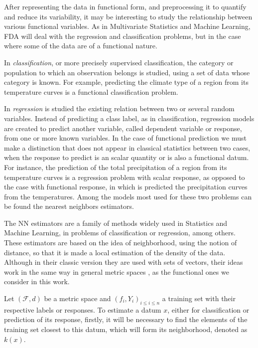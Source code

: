 
After representing the data in functional form, and preprocessing it to quantify and
reduce its variability, it may be interesting to study the relationship between
various functional variables. As in Multivariate Statistics and Machine Learning,
FDA will deal with the regression and classification problems, but in the case
where some of the data are of a functional nature.


In \textit{classification}, or more precisely supervised classification, the category or
population to which an observation belongs is studied, using a set of data whose
category is known. For example, predicting the climate type of a region from
its temperature curves is a functional classification problem.

In \textit{regression} is studied the existing relation between two or several
random variables. Instead of predicting a class label, as in classification,
regression models are created to predict another variable, called dependent
variable or response, from one or more known variables. In the case of
functional prediction we must make a distinction that does not appear in
classical statistics between two cases, when the response to predict is an
scalar quantity or is also a functional datum. For instance, the prediction of
the total precipitation of a region from its temperature curves is a regression
problem with scalar response, as opposed to the case with functional response,
in which is predicted the precipitation curves from the temperatures.
Among the models most used for these two problems can be found the nearest
neighbors estimators.



The \ac{NN} estimators are a family of methods widely
used in Statistics and Machine Learning, in problems of classification or
regression, among others. These estimators are based on the idea of
neighborhood, using the notion of distance, so that it is made a local
estimation of the density of the data.
Although in their classic version they are used with sets of vectors,
their ideas work in the same way in general metric
spaces \cite{baillo2010}, as the functional ones we consider in this work.

Let $(\mathcal{F}, d)$ be a metric space and
$(f_i, {Y}_i)_{i \le i \le n}$ a training set with their
respective labels or responses.
To estimate a datum $x$, either for classification or prediction of its
response, firstly, it will be necessary to find the elements of the training set
closest to this datum, which will form its neighborhood, denoted as $k(x)$.


